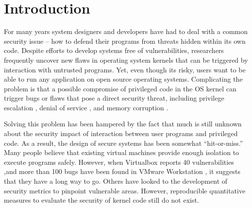 \section{Introduction}
\label{sec.introduction}

For many years system designers and developers have had to deal with a common security issue --
how to defend their programs from threats hidden within its own code. Despite efforts
to develop systems free of vulnerabilities, researchers frequently uncover new flaws in
operating system kernels that can be triggered by interaction with untrusted programs.
Yet, even though its risky, users want to be able to run
 any application on open source operating systems. Complicating the problem is that
a possible compromise of privileged code in the OS kernel can trigger bugs or flaws that
pose a direct security threat, including privilege escalation \cite{CVE-2016-0728, CVE-2015-8660},
denial of service \cite{CVE-2015-8539, CVE-2015-5364}, and memory corruption \cite{CVE-2014-9529}.

Solving this problem has been hampered by the fact that much is still unknown about
 the security impact of interaction between user programs and privileged code.
As a result, the design of secure systems has been
somewhat ``hit-or-miss.'' Many people believe that existing virtual machines provide
enough isolation to execute programs safely. However, when Virtualbox reports 40 vulnerabilities
 \cite{Virtualbox-Vulnerabilities},and
 more than 100 bugs have been found in VMware Workstation \cite{VMWare-Vulnerabilities},
it suggests that they have a long way to go.
Others have looked to the development of security metrics \cite{PittSFIeld, ozment2006milk}
 to pinpoint vulnerable areas.
However, reproducible quantitative measures to evaluate the security of kernel code still do not exist.

